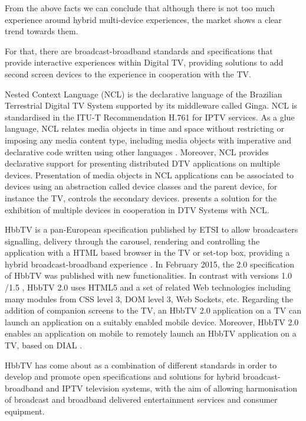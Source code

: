 From the above facts we can conclude that although there is not too much experience around hybrid multi-device experiences, the market shows a clear trend towards them. 

For that, there are broadcast-broadband standards and specifications that provide interactive experiences within Digital TV, providing solutions to add second screen devices to the experience in cooperation with the TV.

Nested Context Language (NCL) \cite{soares2009multiple} is the declarative language of the Brazilian Terrestrial Digital TV System supported by its middleware called Ginga. NCL is standardised in the ITU-T Recommendation H.761 for IPTV services. As a glue language, NCL relates media objects in time and space without restricting or imposing any media content type, including media objects with imperative and declarative code written using other languages \cite{soares2010ginga}. Moreover, NCL provides declarative support for presenting distributed DTV applications on multiple devices. Presentation of media objects in NCL applications can be associated to devices using an abstraction called device classes and the parent device, for instance the TV, controls the secondary devices. \cite{soares2009multiple} presents a solution for the exhibition of multiple devices in cooperation in DTV Systems with NCL.

HbbTV is a pan-European specification published by ETSI to allow broadcasters signalling, delivery through the carousel, rendering and controlling the application with a HTML based browser in the TV or set-top box, providing a hybrid broadcast-broadband experience \cite{merkel2011hybrid}. In February 2015, the 2.0 \cite{hbbtv20} specification of HbbTV  was published with new functionalities. In contrast with versions 1.0 \cite{hbbtv10}/1.5 \cite{hbbtv15}, HbbTV 2.0 uses HTML5 and a set of related Web technologies including many modules from CSS level 3, DOM level 3, Web Sockets, etc. Regarding the addition of companion screens to the TV, an HbbTV 2.0 application on a TV can launch an application on a suitably enabled mobile device. Moreover, HbbTV 2.0 enables an application on mobile to remotely launch an HbbTV application on a TV, based on DIAL \cite{dial}.

HbbTV has come about as a combination of different standards in order to develop and promote open specifications and solutions for hybrid broadcast-broadband and IPTV television systems, with the aim of allowing harmonisation of broadcast and broadband delivered entertainment services and consumer equipment. 



